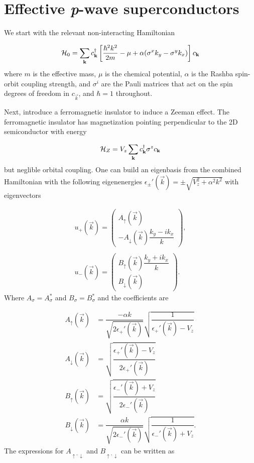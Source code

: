 \section{Effective \textit{p}-wave superconductors}\label{app:eff-p-wave}
We start with the relevant non-interacting Hamiltonian

\begin{equation}
  \mathcal{H}_0 = \sum_{\mathbf{k}}  c^{\dagger}_{\mathbf{k}} \left[\frac{\hbar^2 k^2}{2m} - \mu + \alpha ( \sigma^x k_y - \sigma^y k_x) \right] c_{\mathbf{k}}
\end{equation}
where $m$ is the effective mass, $\mu$ is the chemical potential, $\alpha$ is the Rashba spin-orbit coupling strength, and $\sigma^i$ are the Pauli matrices that act on the spin degrees of freedom in $c_{\vec{k}}$, and $\hbar=1$ throughout.

Next, introduce a ferromagnetic insulator to induce a Zeeman effect.
The ferromagnetic insulator has magnetization pointing perpendicular to the 2D semiconductor with energy

\begin{equation}
  \mathcal{H}_Z = V_z \sum_{\mathbf{k}} c^{\dagger}_{\mathbf{k}} \sigma^z c_{\mathbf{k}}
\end{equation}
but neglible orbital coupling.
One can build an eigenbasis from the combined Hamiltonian with the following eigenenergies $\epsilon_{\pm}'(\vec{k}) = \pm \sqrt{V_z^2+\alpha^2 k^2}$ with eigenvectors

\begin{align}
  u_+(\vec{k})  =
  \left( \begin{array}{l}
      A_\uparrow(\vec{k}) \\
      -A_\downarrow(\vec{k}) \dfrac{k_y - i k_x}{k}
  \end{array} \right),
  \\ \\
  u_-(\vec{k})  =
  \left( \begin{array}{l}
      B_\uparrow(\vec{k}) \dfrac{k_y + i k_x}{k}  \\
      B_\downarrow(\vec{k})
  \end{array} \right).
\end{align}
Where $A_{\sigma}=A_{\sigma}^*$ and $B_{\sigma}=B_{\sigma}^*$ and the coefficients are

\begin{align}
  A_{\uparrow}(\vec{k}) &= \dfrac{-\alpha k}{\sqrt{2\epsilon_+'(\vec{k})}} \sqrt{\dfrac{1}{\epsilon_+'(\vec{k})-V_z}} \\
A_{\downarrow}(\vec{k}) &= \sqrt{\dfrac{\epsilon_+'(\vec{k})-V_z}{2\epsilon_+'(\vec{k})}} \\
B_{\uparrow}(\vec{k}) &= \sqrt{\dfrac{\epsilon_-'(\vec{k})+V_z}{2\epsilon_-'(\vec{k})}} \\
B_{\downarrow}(\vec{k}) &= \dfrac{\alpha k}{\sqrt{2\epsilon_-'(\vec{k})}} \sqrt{\dfrac{1}{\epsilon_-'(\vec{k})+V_z}}.
\end{align}
The expressions for $A_{\uparrow,\downarrow}$ and $B_{\uparrow,\downarrow}$ can be written as


